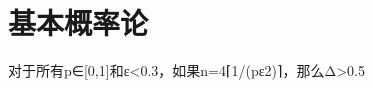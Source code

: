 \chapter{基本概率论}

\begin{theorem}\label{theo:B-3}
对于所有p∈[0,1]和ε<0.3，如果n=4⌈1/(pε2)⌉，那么Δ>0.5
\end{theorem}